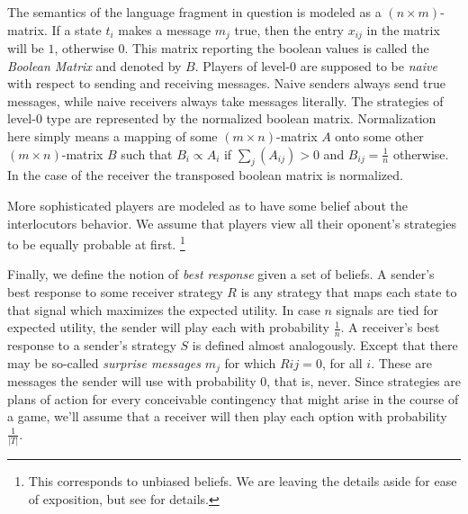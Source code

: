 \documentclass[10pt]{article}
\begin{document}
The semantics of the language fragment in question is modeled as a $(n \times m)$-matrix. If a state $t_i$ makes a message $m_j$ true, then the entry $x_{ij}$ in the matrix will be $1$, otherwise $0$. This matrix reporting the boolean values is called the \textit{Boolean Matrix} and denoted by $B$.
Players of level-0 are supposed to be \textit{naive} with respect to sending and receiving messages. Naive senders always send true messages, while naive receivers always take messages literally.
The strategies of level-0 type are represented by the normalized boolean matrix. Normalization here simply means a mapping of some $(m\times n)$-matrix $A$ onto some other $(m\times n)$-matrix $B$ such that $B_i\propto A_i$ if $\sum_j (A_{ij})>0$ and $B_{ij}=\tfrac{1}{n}$ otherwise. In the case of the receiver the transposed boolean matrix is normalized.

More sophisticated players are modeled as to have some belief about the interlocutors behavior. We assume that players view all their oponent's strategies to be equally probable at first. \footnote{This corresponds to unbiased beliefs. We are leaving the details aside for ease of exposition, but see \cite{franke2013pragmatic} for details.}

Finally, we define the notion of \textit{best response} given a set of beliefs. A sender's best response to some receiver strategy $R$ is any strategy that maps each state to that signal which maximizes the expected utility. In case $n$ signals are tied for expected utility, the sender will play each with probability $\tfrac{1}{n}$.
A receiver's best response to a sender's strategy $S$ is defined almost analogously. Except that there may be so-called \textit{surprise messages} $m_j$ for which $R{ij}=0$, for all $i$. These are messages the sender will use with probability 0, that is, never. Since strategies are plans of action for every conceivable contingency that might arise in the course of a game, we'll assume that a receiver will then play each option with probability $\tfrac{1}{|T|}$.
\end{document}
